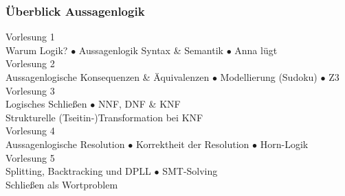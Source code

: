\documentclass[aspectratio=1610,onlymath]{beamer}
\begin{document}
\maketitle


\begin{frame}\frametitle{Überblick Aussagenlogik}

\begin{center}
\alert{Vorlesung 1}\\
Warum Logik? $\bullet$ Aussagenlogik Syntax \& Semantik $\bullet$ Anna lügt\\[1ex]
\alert{Vorlesung 2}\\
Aussagenlogische Konsequenzen \& Äquivalenzen $\bullet$ Modellierung (Sudoku) $\bullet$ Z3 \\[1ex]
\alert{Vorlesung 3}\\Logisches Schließen $\bullet$ NNF, DNF \& KNF\\ Strukturelle (Tseitin-)Transformation bei KNF \\[1ex]
\alert{Vorlesung 4}\\Aussagenlogische Resolution $\bullet$ Korrektheit der Resolution $\bullet$ Horn-Logik \\[1ex]
\alert{Vorlesung 5}\\Splitting, Backtracking und DPLL $\bullet$ SMT-Solving\\ Schließen als Wortproblem
\end{center}


\end{frame}
\end{document}
